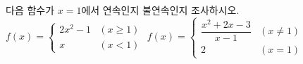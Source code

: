 다음 함수가 $x=1$에서 연속인지 불연속인지 조사하시오.
 $f(x)=\begin{cases} 2x^2-1 & (x\ge 1) \\ x & (x<1) \end{cases}$
 $f(x)=\begin{cases} \dfrac{x^2+2x-3}{x-1} & (x\ne 1) \\ 2 & (x=1) \end{cases}$
